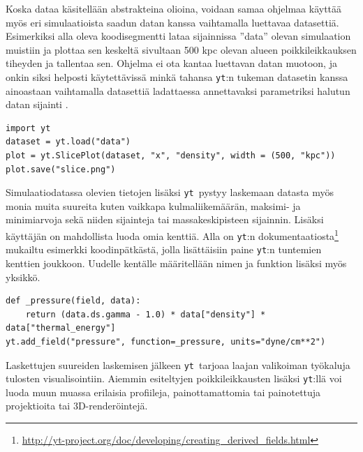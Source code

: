 \documentclass[12pt,a4paper]{article}
\newcommand{\yt}{\texttt{yt}}
\begin{document}
Koska dataa käsitellään abstrakteina olioina, voidaan samaa ohjelmaa käyttää myös eri simulaatioista saadun datan kanssa vaihtamalla luettavaa datasettiä. Esimerkiksi alla oleva koodisegmentti lataa sijainnissa ''data'' olevan simulaation muistiin ja plottaa sen keskeltä sivultaan 500 kpc olevan alueen poikkileikkauksen tiheyden ja tallentaa sen. Ohjelma ei ota kantaa luettavan datan muotoon, ja onkin siksi helposti käytettävissä minkä tahansa \yt :n tukeman datasetin kanssa ainoastaan vaihtamalla datasettiä ladattaessa annettavaksi parametriksi halutun datan sijainti \cite{yt, cookbook}.

\begin{minipage}{\textwidth}
\lstset{style=python}
\begin{lstlisting}
import yt
dataset = yt.load("data")
plot = yt.SlicePlot(dataset, "x", "density", width = (500, "kpc"))
plot.save("slice.png")
\end{lstlisting}
\end{minipage}

Simulaatiodatassa olevien tietojen lisäksi \yt\ pystyy laskemaan datasta myös monia muita suureita kuten vaikkapa kulmaliikemäärän, maksimi- ja minimiarvoja sekä niiden sijainteja tai massakeskipisteen sijainnin. Lisäksi käyttäjän on mahdollista luoda omia kenttiä. Alla on \yt :n dokumentaatiosta\footnote{\url{http://yt-project.org/doc/developing/creating_derived_fields.html}} mukailtu esimerkki koodinpätkästä, jolla lisättäisiin paine \yt :n tuntemien kenttien joukkoon. Uudelle kentälle määritellään nimen ja funktion lisäksi myös yksikkö. \cite{yt, derivedfields}

\begin{minipage}{\textwidth}
\lstset{style=python}
\begin{lstlisting}
def _pressure(field, data):
    return (data.ds.gamma - 1.0) * data["density"] * data["thermal_energy"]
yt.add_field("pressure", function=_pressure, units="dyne/cm**2")
\end{lstlisting}%
\end{minipage}

Laskettujen suureiden laskemisen jälkeen \yt\ tarjoaa laajan valikoiman työkaluja tulosten visualisointiin. Aiemmin esiteltyjen poikkileikkausten lisäksi \yt :llä voi luoda muun muassa erilaisia profiileja, painottamattomia tai painotettuja projektioita tai 3D-renderöintejä. \cite{yt}
\end{document}
